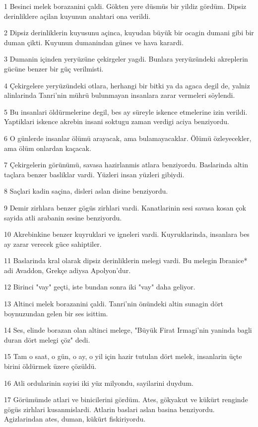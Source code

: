 \par 1 Besinci melek borazanini çaldi. Gökten yere düsmüs bir yildiz gördüm. Dipsiz derinliklere açilan kuyunun anahtari ona verildi.
\par 2 Dipsiz derinliklerin kuyusunu açinca, kuyudan büyük bir ocagin dumani gibi bir duman çikti. Kuyunun dumanindan günes ve hava karardi.
\par 3 Dumanin içinden yeryüzüne çekirgeler yagdi. Bunlara yeryüzündeki akreplerin gücüne benzer bir güç verilmisti.
\par 4 Çekirgelere yeryüzündeki otlara, herhangi bir bitki ya da agaca degil de, yalniz alinlarinda Tanri'nin mührü bulunmayan insanlara zarar vermeleri söylendi.
\par 5 Bu insanlari öldürmelerine degil, bes ay süreyle iskence etmelerine izin verildi. Yaptiklari iskence akrebin insani soktugu zaman verdigi aciya benziyordu.
\par 6 O günlerde insanlar ölümü arayacak, ama bulamayacaklar. Ölümü özleyecekler, ama ölüm onlardan kaçacak.
\par 7 Çekirgelerin görünümü, savasa hazirlanmis atlara benziyordu. Baslarinda altin taçlara benzer basliklar vardi. Yüzleri insan yüzleri gibiydi.
\par 8 Saçlari kadin saçina, disleri aslan disine benziyordu.
\par 9 Demir zirhlara benzer gögüs zirhlari vardi. Kanatlarinin sesi savasa kosan çok sayida atli arabanin sesine benziyordu.
\par 10 Akrebinkine benzer kuyruklari ve igneleri vardi. Kuyruklarinda, insanlara bes ay zarar verecek güce sahiptiler.
\par 11 Baslarinda kral olarak dipsiz derinliklerin melegi vardi. Bu melegin Ibranice* adi Avaddon, Grekçe adiysa Apolyon'dur.
\par 12 Birinci "vay" geçti, iste bundan sonra iki "vay" daha geliyor.
\par 13 Altinci melek borazanini çaldi. Tanri'nin önündeki altin sunagin dört boynuzundan gelen bir ses isittim.
\par 14 Ses, elinde borazan olan altinci melege, "Büyük Firat Irmagi'nin yaninda bagli duran dört melegi çöz" dedi.
\par 15 Tam o saat, o gün, o ay, o yil için hazir tutulan dört melek, insanlarin üçte birini öldürmek üzere çözüldü.
\par 16 Atli ordularinin sayisi iki yüz milyondu, sayilarini duydum.
\par 17 Görümümde atlari ve binicilerini gördüm. Ates, gökyakut ve kükürt renginde gögüs zirhlari kusanmislardi. Atlarin baslari aslan basina benziyordu. Agizlarindan ates, duman, kükürt fiskiriyordu.
